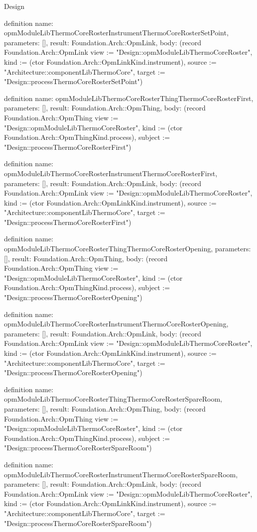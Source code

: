 \begin{lexlean}{Design}
\begin{semanticmodule}
definition{
  name: opmModuleLibThermoCoreRosterInstrumentThermoCoreRosterSetPoint,
  parameters: [],
  result: Foundation.Arch::OpmLink,
  body: (record Foundation.Arch::OpmLink {view := "Design::opmModuleLibThermoCoreRoster", kind := (ctor Foundation.Arch::OpmLinkKind.instrument), source := "Architecture::componentLibThermoCore", target := "Design::processThermoCoreRosterSetPoint"})
}

definition{
  name: opmModuleLibThermoCoreRosterThingThermoCoreRosterFirst,
  parameters: [],
  result: Foundation.Arch::OpmThing,
  body: (record Foundation.Arch::OpmThing {view := "Design::opmModuleLibThermoCoreRoster", kind := (ctor Foundation.Arch::OpmThingKind.process), subject := "Design::processThermoCoreRosterFirst"})
}

definition{
  name: opmModuleLibThermoCoreRosterInstrumentThermoCoreRosterFirst,
  parameters: [],
  result: Foundation.Arch::OpmLink,
  body: (record Foundation.Arch::OpmLink {view := "Design::opmModuleLibThermoCoreRoster", kind := (ctor Foundation.Arch::OpmLinkKind.instrument), source := "Architecture::componentLibThermoCore", target := "Design::processThermoCoreRosterFirst"})
}

definition{
  name: opmModuleLibThermoCoreRosterThingThermoCoreRosterOpening,
  parameters: [],
  result: Foundation.Arch::OpmThing,
  body: (record Foundation.Arch::OpmThing {view := "Design::opmModuleLibThermoCoreRoster", kind := (ctor Foundation.Arch::OpmThingKind.process), subject := "Design::processThermoCoreRosterOpening"})
}

definition{
  name: opmModuleLibThermoCoreRosterInstrumentThermoCoreRosterOpening,
  parameters: [],
  result: Foundation.Arch::OpmLink,
  body: (record Foundation.Arch::OpmLink {view := "Design::opmModuleLibThermoCoreRoster", kind := (ctor Foundation.Arch::OpmLinkKind.instrument), source := "Architecture::componentLibThermoCore", target := "Design::processThermoCoreRosterOpening"})
}

definition{
  name: opmModuleLibThermoCoreRosterThingThermoCoreRosterSpareRoom,
  parameters: [],
  result: Foundation.Arch::OpmThing,
  body: (record Foundation.Arch::OpmThing {view := "Design::opmModuleLibThermoCoreRoster", kind := (ctor Foundation.Arch::OpmThingKind.process), subject := "Design::processThermoCoreRosterSpareRoom"})
}

definition{
  name: opmModuleLibThermoCoreRosterInstrumentThermoCoreRosterSpareRoom,
  parameters: [],
  result: Foundation.Arch::OpmLink,
  body: (record Foundation.Arch::OpmLink {view := "Design::opmModuleLibThermoCoreRoster", kind := (ctor Foundation.Arch::OpmLinkKind.instrument), source := "Architecture::componentLibThermoCore", target := "Design::processThermoCoreRosterSpareRoom"})
}


\end{semanticmodule}
\end{lexlean}
